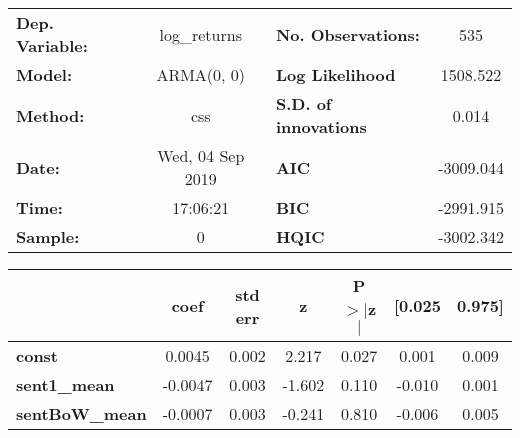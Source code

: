 \begin{center}
\begin{tabular}{lclc}
\toprule
\textbf{Dep. Variable:} &   log\_returns   & \textbf{  No. Observations:  } &    535      \\
\textbf{Model:}         &    ARMA(0, 0)    & \textbf{  Log Likelihood     } &  1508.522   \\
\textbf{Method:}        &       css        & \textbf{  S.D. of innovations} &   0.014     \\
\textbf{Date:}          & Wed, 04 Sep 2019 & \textbf{  AIC                } & -3009.044   \\
\textbf{Time:}          &     17:06:21     & \textbf{  BIC                } & -2991.915   \\
\textbf{Sample:}        &        0         & \textbf{  HQIC               } & -3002.342   \\
\bottomrule
\end{tabular}
\begin{tabular}{lcccccc}
                       & \textbf{coef} & \textbf{std err} & \textbf{z} & \textbf{P$> |$z$|$} & \textbf{[0.025} & \textbf{0.975]}  \\
\midrule
\textbf{const}         &       0.0045  &        0.002     &     2.217  &         0.027        &        0.001    &        0.009     \\
\textbf{sent1\_mean}   &      -0.0047  &        0.003     &    -1.602  &         0.110        &       -0.010    &        0.001     \\
\textbf{sentBoW\_mean} &      -0.0007  &        0.003     &    -0.241  &         0.810        &       -0.006    &        0.005     \\
\bottomrule
\end{tabular}
\end{center}
